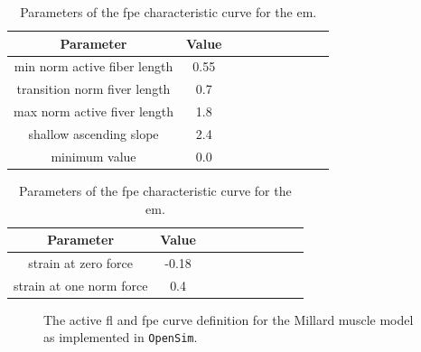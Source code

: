 \documentclass[11pt,a4paper,draft=false]{report}
\begin{document}
\begin{table}
  \centering
  \parbox{.45\linewidth}{
    \centering
    \caption{Parameters of the active \gls{fl} characteristic curve for the
      \gls{em}.}\label{tab:eye-fl-curve}
    \begin{tabular}{@{}cccccccccc@{}}
      \toprule
      \textbf{Parameter} & \textbf{Value} \\
      \midrule
      min norm active fiber length & 0.55 \\
      transition norm fiver length & 0.7 \\
      max norm active fiver length & 1.8 \\
      shallow ascending slope &  2.4 \\
      minimum value & 0.0 \\
      \bottomrule
    \end{tabular}
  }
  \quad
  \parbox{.45\linewidth}{
    \vspace{-1.5cm}
    \centering
    \caption{Parameters of the \gls{fpe} characteristic curve for the
      \gls{em}.}\label{tab:eye-fpe-curve}
    \begin{tabular}{@{}cccccccccc@{}}
      \toprule
      \textbf{Parameter} & \textbf{Value} \\
      \midrule
      strain at zero force & -0.18 \\
      strain at one norm force & 0.4 \\
      \bottomrule
    \end{tabular}
  }
\end{table}

\begin{figure}[ht]
  \centering
  \caption{The active \gls{fl} and \gls{fpe} curve definition for the Millard
    muscle model as implemented in \texttt{OpenSim}.}\label{fig:millard-curves}
\end{figure}
\end{document}
